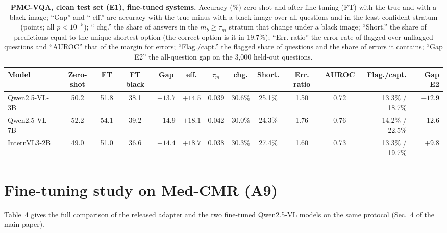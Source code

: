 \begin{table}[h]
  \centering
  \footnotesize
  \setlength{\tabcolsep}{3pt}
  \begin{tabular}{@{}lccccccccccrr@{}}
    \toprule
    Model & Zero-shot & FT & FT black & Gap & \LO{} eff. & $\tau_m$ & \HI{} chg. & Short. & Err. ratio & AUROC & Flag./capt. & Gap E2 \\
    \midrule
    Qwen2.5-VL-3B & 50.2 & 51.8 & 38.1 & $+13.7$ & $+14.5$ & 0.039 & 30.6\% & 25.1\% & 1.50 & 0.72 & 13.3\% / 18.7\% & $+12.9$ \\
    Qwen2.5-VL-7B & 52.2 & 54.1 & 39.2 & $+14.9$ & $+18.1$ & 0.042 & 30.0\% & 24.3\% & 1.76 & 0.76 & 14.2\% / 22.5\% & $+12.6$ \\
    InternVL3-2B & 49.0 & 51.0 & 36.6 & $+14.4$ & $+18.7$ & 0.038 & 30.3\% & 27.4\% & 1.60 & 0.73 & 13.3\% / 19.7\% & $+9.8$ \\
    \bottomrule
  \end{tabular}
  \caption{\textbf{PMC-VQA, clean test set (E1), fine-tuned systems.} Accuracy (\%) zero-shot and after fine-tuning (FT) with the true and with a black image; ``Gap'' and ``\LO{} eff.'' are accuracy with the true minus with a black image over all questions and in the least-confident stratum (points; all $p<10^{-5}$); ``\HI{} chg.'' the share of answers in the $m_b\ge\tau_m$ stratum that change under a black image; ``Short.'' the share of predictions equal to the unique shortest option (the correct option is it in 19.7\%); ``Err. ratio'' the error rate of flagged over unflagged questions and ``AUROC'' that of the margin for errors; ``Flag./capt.'' the flagged share of questions and the share of errors it contains; ``Gap E2'' the all-question gap on the 3{,}000 held-out questions.}
  \label{tab:pmc}
\end{table}

\section{Fine-tuning study on Med-CMR (A9)}
\label{app:ft}

Table~4 gives the full comparison of the released adapter and the two fine-tuned Qwen2.5-VL models on the same protocol (Sec.~4 of the main paper).

